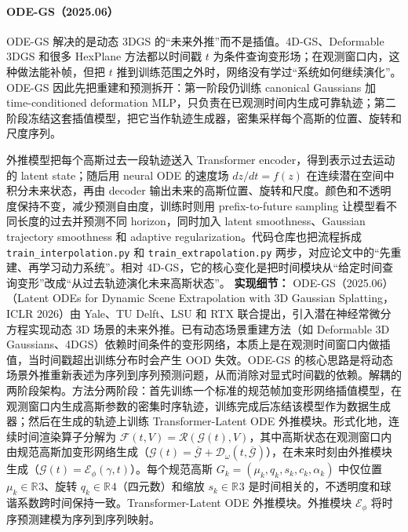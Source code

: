 \paragraph{ODE-GS（2025.06）\cite{2506_05480}}
ODE-GS 解决的是动态 3DGS 的“未来外推”而不是插值。4D-GS、Deformable 3DGS 和很多 HexPlane 方法都以时间戳 $t$ 为条件查询变形场；在观测窗口内，这种做法能补帧，但把 $t$ 推到训练范围之外时，网络没有学过“系统如何继续演化”。ODE-GS 因此先把重建和预测拆开：第一阶段仍训练 canonical Gaussians 加 time-conditioned deformation MLP，只负责在已观测时间内生成可靠轨迹；第二阶段冻结这套插值模型，把它当作轨迹生成器，密集采样每个高斯的位置、旋转和尺度序列。

外推模型把每个高斯过去一段轨迹送入 Transformer encoder，得到表示过去运动的 latent state；随后用 neural ODE 的速度场 $dz/dt=f(z)$ 在连续潜在空间中积分未来状态，再由 decoder 输出未来的高斯位置、旋转和尺度。颜色和不透明度保持不变，减少预测自由度，训练时则用 prefix-to-future sampling 让模型看不同长度的过去并预测不同 horizon，同时加入 latent smoothness、Gaussian trajectory smoothness 和 adaptive regularization。代码仓库也把流程拆成 \texttt{train\_interpolation.py} 和 \texttt{train\_extrapolation.py} 两步，对应论文中的“先重建、再学习动力系统”。相对 4D-GS，它的核心变化是把时间模块从“给定时间查询变形”改成“从过去轨迹演化未来高斯状态”。
\textbf{实现细节：} ODE-GS（2025.06） （Latent ODEs for Dynamic Scene Extrapolation with 3D Gaussian Splatting，ICLR 2026）由 Yale、TU Delft、LSU 和 RTX 联合提出，引入潜在神经常微分方程实现动态 3D 场景的未来外推。已有动态场景重建方法（如 Deformable 3D Gaussians、4DGS）依赖时间条件的变形网络，本质上是在观测时间窗口内做插值，当时间戳超出训练分布时会产生 OOD 失效。ODE-GS 的核心思路是将动态场景外推重新表述为序列到序列预测问题，从而消除对显式时间戳的依赖。解耦的两阶段架构。方法分两阶段：首先训练一个标准的规范帧加变形网络插值模型，在观测窗口内生成高斯参数的密集时序轨迹，训练完成后冻结该模型作为数据生成器；然后在生成的轨迹上训练 Transformer-Latent ODE 外推模块。形式化地，连续时间渲染算子分解为 $\mathcal{F}(t,V) = \mathcal{R}(\mathcal{G}(t), V)$，其中高斯状态在观测窗口内由规范高斯加变形网络生成（$\mathcal{G}(t) = \overline{\mathcal{G}} + \mathcal{D}_\omega(t, \overline{\mathcal{G}})$），在未来时刻由外推模块生成（$\mathcal{G}(t) = \mathcal{E}_\phi(\gamma, t)$）。每个规范高斯 $G_k = (\mu_k, q_k, s_k, c_k, \alpha_k)$ 中仅位置 $\mu_k \in \mathbb{R}^{}3$、旋转 $q_k \in \mathbb{R}^{}4$（四元数）和缩放 $s_k \in \mathbb{R}^{}3$ 是时间相关的，不透明度和球谐系数跨时间保持一致。Transformer-Latent ODE 外推模块。外推模块 $\mathcal{E}_\phi$ 将时序预测建模为序列到序列映射。
